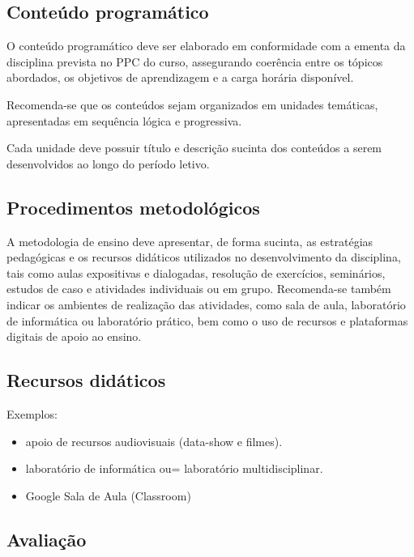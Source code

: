\documentclass[oneside,a4paper,12pt]{article}
\begin{document}
  \begin{snugshade}
  \section{Conteúdo programático} %
  \end{snugshade}

  O conteúdo programático deve ser elaborado em conformidade com a ementa da disciplina prevista no PPC do curso, assegurando coerência entre os tópicos abordados, os objetivos de aprendizagem e a carga horária disponível.

  Recomenda-se que os conteúdos sejam organizados em unidades temáticas, apresentadas em sequência lógica e progressiva.

  Cada unidade deve possuir título e descrição sucinta dos conteúdos a serem desenvolvidos ao longo do período letivo.



  \begin{snugshade}
  \section{Procedimentos metodológicos} %
  \end{snugshade}

A metodologia de ensino deve apresentar, de forma sucinta, as estratégias pedagógicas e os recursos didáticos utilizados no desenvolvimento da disciplina, tais como aulas expositivas e dialogadas, resolução de exercícios, seminários, estudos de caso e atividades individuais ou em grupo. Recomenda-se também indicar os ambientes de realização das atividades, como sala de aula, laboratório de informática ou laboratório prático, bem como o uso de recursos e plataformas digitais de apoio ao ensino.


  \begin{snugshade}
  \section{Recursos didáticos} %
  \end{snugshade}
  Exemplos:
    \begin{itemize}
	  \item apoio de recursos audiovisuais (data-show e filmes).
	  \item laboratório de informática ou= laboratório multidisciplinar.
	  \item Google Sala de Aula (Classroom)
    \end{itemize}
  \begin{snugshade}
\section{Avaliação}
\end{snugshade}
\end{document}
